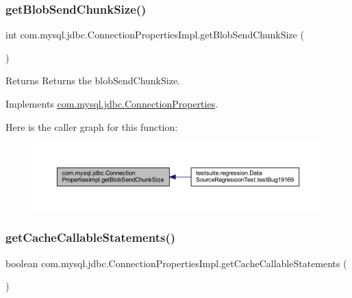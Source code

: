 \subsubsection{\texorpdfstring{get\+Blob\+Send\+Chunk\+Size()}{getBlobSendChunkSize()}}
{\footnotesize\ttfamily int com.\+mysql.\+jdbc.\+Connection\+Properties\+Impl.\+get\+Blob\+Send\+Chunk\+Size (\begin{DoxyParamCaption}{ }\end{DoxyParamCaption})}

\begin{DoxyReturn}{Returns}
Returns the blob\+Send\+Chunk\+Size. 
\end{DoxyReturn}


Implements \mbox{\hyperlink{interfacecom_1_1mysql_1_1jdbc_1_1_connection_properties_a722ef2a90bea1ca220340a055850527f}{com.\+mysql.\+jdbc.\+Connection\+Properties}}.

Here is the caller graph for this function\+:\nopagebreak
\begin{figure}[H]
\begin{center}
\leavevmode
\includegraphics[width=350pt]{classcom_1_1mysql_1_1jdbc_1_1_connection_properties_impl_a5ca22a669571156661ef7710ceb5ecd3_icgraph}
\end{center}
\end{figure}
\mbox{\label{classcom_1_1mysql_1_1jdbc_1_1_connection_properties_impl_a5e551ecbfcb75e6223467fc28ac3012b}} 
\subsubsection{\texorpdfstring{get\+Cache\+Callable\+Statements()}{getCacheCallableStatements()}}
{\footnotesize\ttfamily boolean com.\+mysql.\+jdbc.\+Connection\+Properties\+Impl.\+get\+Cache\+Callable\+Statements (\begin{DoxyParamCaption}{ }\end{DoxyParamCaption})}

